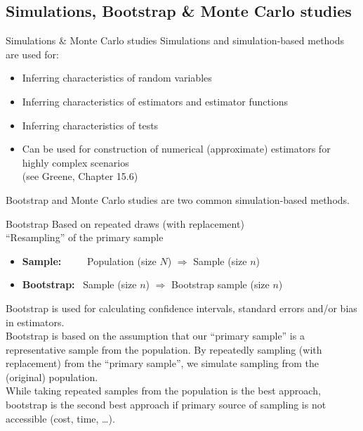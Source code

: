 \documentclass[usenames,dvipsnames]{beamer}
\begin{document}
\subsection{Simulations, Bootstrap \& Monte Carlo studies}
\begin{frame}{Simulations \& Monte Carlo studies}
Simulations and simulation-based methods are used for:
\bigskip
\begin{itemize}
    \item Inferring characteristics of random variables
    \item Inferring characteristics of estimators and estimator functions
    \item Inferring characteristics of tests
    \item Can be used for construction of numerical (approximate) estimators for highly complex scenarios \\(see Greene, Chapter 15.6)
\end{itemize}
\medskip
Bootstrap and Monte Carlo studies are two common simulation-based methods.
\end{frame}
\begin{frame}{Bootstrap}
Based on repeated draws (with replacement)\\
``Resampling'' of the primary sample
\bigskip
\begin{itemize}
    \item[] \textbf{Sample:~~~~} Population (size $N$) $\Rightarrow$ Sample (size $n$) 
    \item[] \textbf{Bootstrap:} ~Sample (size $n$) $\Rightarrow$ Bootstrap sample (size $n$) 
\end{itemize}
\bigskip
Bootstrap is used for calculating confidence intervals, standard errors and/or bias in estimators.\\
\bigskip
Bootstrap is based on the assumption that our ``primary sample'' is a representative sample from the population. By repeatedly sampling (with replacement) from the ``primary sample'', we simulate sampling from the (original) population.\\
\bigskip
While taking repeated samples from the population is the best approach, bootstrap is the second best approach if primary source of sampling is not accessible (cost, time, \dots).
\end{frame}
\end{document}
